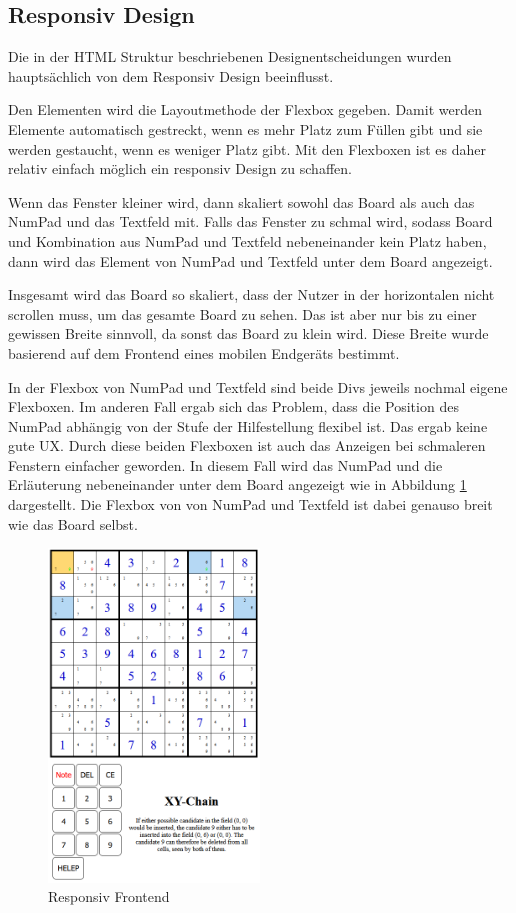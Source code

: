 \subsection{Responsiv Design}

Die in der \ac{HTML} Struktur beschriebenen Designentscheidungen wurden hauptsächlich von dem Responsiv Design beeinflusst. 

Den Elementen wird die Layoutmethode der Flexbox gegeben. Damit werden Elemente automatisch gestreckt, wenn es mehr Platz zum Füllen gibt und sie werden gestaucht, wenn es weniger Platz gibt. Mit den Flexboxen ist es daher relativ einfach möglich ein responsiv Design zu schaffen. 

Wenn das Fenster kleiner wird, dann skaliert sowohl das Board als auch das NumPad und das Textfeld mit. Falls das Fenster zu schmal wird, sodass Board und Kombination aus NumPad und Textfeld nebeneinander kein Platz haben, dann wird das Element von NumPad und Textfeld unter dem Board angezeigt.

Insgesamt wird das Board so skaliert, dass der Nutzer in der horizontalen nicht scrollen muss, um das gesamte Board zu sehen. Das ist aber nur bis zu einer gewissen Breite sinnvoll, da sonst das Board zu klein wird. Diese Breite wurde basierend auf dem Frontend eines mobilen Endgeräts bestimmt.

In der Flexbox von NumPad und Textfeld sind beide Divs jeweils nochmal eigene Flexboxen. Im anderen Fall ergab sich das Problem, dass die Position des NumPad abhängig von der Stufe der Hilfestellung flexibel ist. Das ergab keine gute \ac{UX}. Durch diese beiden Flexboxen ist auch das Anzeigen bei schmaleren Fenstern einfacher geworden. In diesem Fall wird das NumPad und die Erläuterung nebeneinander unter dem Board angezeigt wie in Abbildung \ref{fig:Responsiv} dargestellt. Die Flexbox von von NumPad und Textfeld ist dabei genauso breit wie das Board selbst.

\begin{figure}[htbp]
	\centering
	\includegraphics[width=0.5\textwidth]{images/Bilduntereinander.png}
	\caption{Responsiv Frontend}
	\label{fig:Responsiv}
\end{figure}

